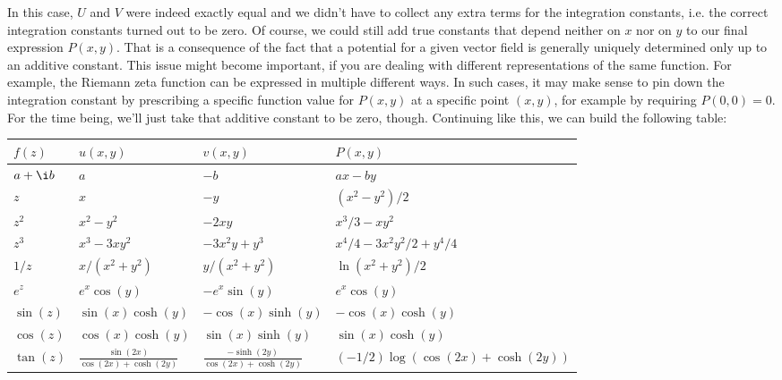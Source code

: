 \documentclass[12pt]{article}
\begin{document}
In this case, $U$ and $V$ were indeed exactly equal and we didn't have to collect any extra terms for the integration constants, i.e. the correct integration constants turned out to be zero. Of course, we could still add true constants that depend neither on $x$ nor on $y$ to our final expression $P(x,y)$. That is a consequence of the fact that a potential for a given vector field is generally uniquely determined only up to an additive constant. This issue might become important, if you are dealing with different representations of the same function. For example, the Riemann zeta function can be expressed in multiple different ways. In such cases, it may make sense to pin down the integration constant by prescribing a specific function value for $P(x,y)$ at a specific point $(x,y)$, for example by requiring $P(0,0) = 0$. For the time being, we'll just take that additive constant to be zero, though. Continuing like this, we can build the following table:
\begin{center}
\begin{tabular}{ |p{1cm}|p{3cm}|p{3cm}|p{6cm}|  }
\hline
$f(z)$     & $u(x,y)$           & $v(x,y)$            & $P(x,y)$  \\
\hline
$a + \i b$ & $a$                & $-b$                & $a x - b y $                    \\
$z$        & $x$                & $-y$                & $(x^2 - y^2)/2 $                \\
$z^2$      & $x^2 - y^2$        & $-2xy$              & $x^3/3 - xy^2 $                 \\
$z^3$      & $x^3 - 3 x y^2$    & $-3 x^2 y + y^3$    & $x^4/4 - 3 x^2 y^2 / 2 + y^4/4$ \\
$1/z$      & $x/(x^2 + y^2)$    & $y/(x^2 + y^2)$     & $\ln(x^2+y^2)/2$                \\
$e^z$      & $e^x \cos(y)$      & $-e^x \sin(y)$      & $e^x \cos(y) $                  \\
$\sin(z)$  & $\sin(x) \cosh(y)$ & $-\cos(x) \sinh(y)$ & $-\cos(x) \cosh(y)$             \\
$\cos(z)$  & $\cos(x) \cosh(y)$ & $\sin(x) \sinh(y)$  & $ \sin(x) \cosh(y)$             \\
$\tan(z)$  & $ \frac{\sin(2x)}{\cos(2x) + \cosh(2y)}$              
           & $\frac{-\sinh(2y)}{\cos(2x) + \cosh(2y)}$               
           & $(-1/2) \log(\cos(2x) + \cosh(2y))$             \\
\hline
\end{tabular}
\end{center}
\end{document}
